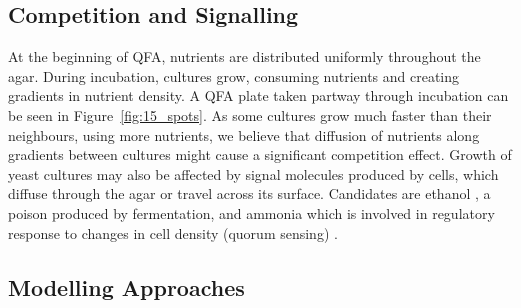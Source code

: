 \begin{multicols}{2}


\subsection{Competition and Signalling}

At the beginning of QFA, nutrients are distributed uniformly throughout the
agar. During incubation, cultures grow, consuming nutrients and creating gradients in
nutrient density. A QFA plate taken partway through incubation can be
seen in Figure~\ref{fig:15_spots}. As some cultures grow much faster than their
neighbours, using more nutrients, we believe that diffusion of nutrients along gradients
between cultures might cause a significant competition effect. Growth of yeast cultures
may also be affected by signal molecules produced by cells, which diffuse through the
agar or travel across its surface. Candidates are ethanol \citep{fujita2006}, a poison
produced by fermentation, and ammonia which is involved in regulatory response
to changes in cell density (quorum sensing) \citep{sprague2006,honigberg2011}.

\subsection{Modelling Approaches}


\end{multicols}
